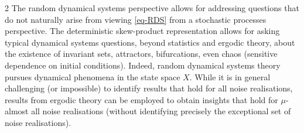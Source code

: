 \documentclass[11pt]{article}
\begin{document}
\begin{multicols}{2}
The random dynamical systems perspective allows for addressing questions that do not naturally arise from viewing \eqref{eq-RDS} from a stochastic processes perspective. The deterministic skew-product representation allows for asking typical dynamical systems questions, beyond statistics and ergodic theory, about the existence of invariant sets, attractors, bifurcations, even chaos (sensitive dependence on initial conditions). Indeed, random dynamical systems theory pursues dynamical phenomena in the state space $X$. While it is in general challenging (or impossible) to identify results that hold for all noise realisations, results from ergodic theory can be employed to obtain insights that hold for $\mu$-almost all noise realisations (without identifying precisely the exceptional set of noise realisations).



\end{multicols}
\end{document}
